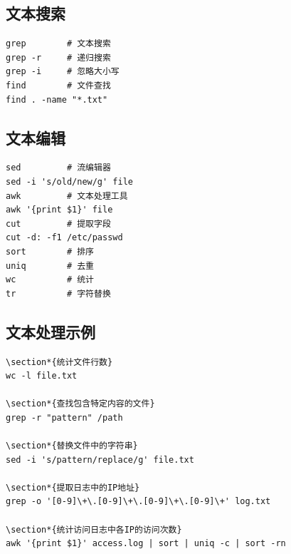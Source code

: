 \documentclass[12pt,UTF8]{ctexbook}
\begin{document}
\subsection*{文本搜索}

\begin{verbatim}
grep        # 文本搜索
grep -r     # 递归搜索
grep -i     # 忽略大小写
find        # 文件查找
find . -name "*.txt"
\end{verbatim}

\subsection*{文本编辑}

\begin{verbatim}
sed         # 流编辑器
sed -i 's/old/new/g' file
awk         # 文本处理工具
awk '{print $1}' file
cut         # 提取字段
cut -d: -f1 /etc/passwd
sort        # 排序
uniq        # 去重
wc          # 统计
tr          # 字符替换
\end{verbatim}

\subsection*{文本处理示例}

\begin{verbatim}
\section*{统计文件行数}
wc -l file.txt

\section*{查找包含特定内容的文件}
grep -r "pattern" /path

\section*{替换文件中的字符串}
sed -i 's/pattern/replace/g' file.txt

\section*{提取日志中的IP地址}
grep -o '[0-9]\+\.[0-9]\+\.[0-9]\+\.[0-9]\+' log.txt

\section*{统计访问日志中各IP的访问次数}
awk '{print $1}' access.log | sort | uniq -c | sort -rn
\end{verbatim}
\end{document}
